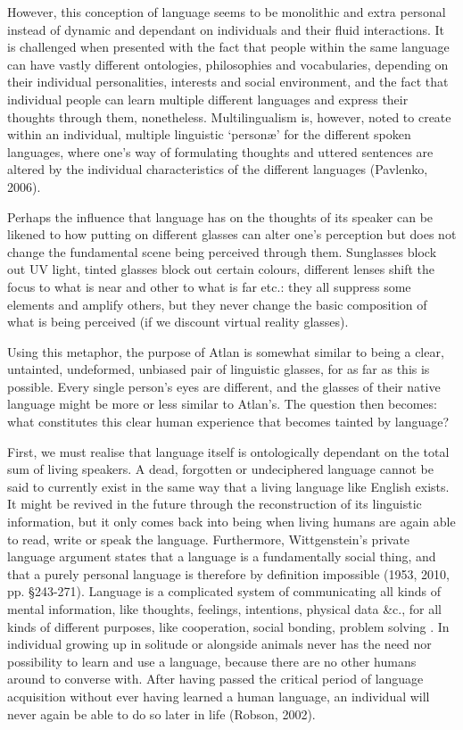 However, this conception of language seems to be monolithic and extra personal instead of dynamic and dependant on individuals and their fluid interactions. It is challenged when presented with the fact that people within the same language can have vastly different ontologies, philosophies and vocabularies, depending on their individual personalities, interests and social environment, and the fact that individual people can learn multiple different languages and express their thoughts through them, nonetheless. Multilingualism is, however, noted to create within an individual, multiple linguistic ‘personæ’ for the different spoken languages, where one’s way of formulating thoughts and uttered sentences are altered by the individual characteristics of the different languages  (Pavlenko, 2006). 

Perhaps the influence that language has on the thoughts of its speaker can be likened to how putting on different glasses can alter one’s perception but does not change the fundamental scene being perceived through them. Sunglasses block out UV light, tinted glasses block out certain colours, different lenses shift the focus to what is near and other to what is far etc.: they all suppress some elements and amplify others, but they never change the basic composition of what is being perceived (if we discount virtual reality glasses). 

Using this metaphor, the purpose of Atlan is somewhat similar to being a clear, untainted, undeformed, unbiased pair of linguistic glasses, for as far as this is possible. Every single person’s eyes are different, and the glasses of their native language might be more or less similar to Atlan’s. The question then becomes: what constitutes this clear human experience that becomes tainted by language?  

First, we must realise that language itself is ontologically dependant on the total sum of living speakers. A dead, forgotten or undeciphered language cannot be said to currently exist in the same way that a living language like English exists. It might be revived in the future through the reconstruction of its linguistic information, but it only comes back into being when living humans are again able to read, write or speak the language. Furthermore, Wittgenstein’s private language argument states that a language is a fundamentally social thing, and that a purely personal language is therefore by definition impossible (1953, 2010, pp. \S 243-271). Language is a complicated system of communicating all kinds of mental information, like thoughts, feelings, intentions, physical data \&c., for all kinds of different purposes, like cooperation, social bonding, problem solving . In individual growing up in solitude or alongside animals never has the need nor possibility to learn and use a language, because there are no other humans around to converse with. After having passed the critical period of language acquisition without ever having learned a human language, an individual will never again be able to do so later in life (Robson, 2002).  

